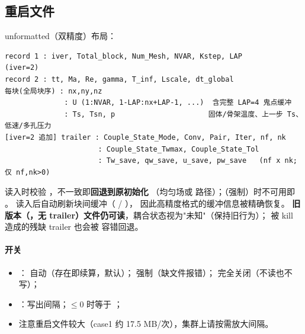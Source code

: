\subsection{重启文件 }
\label{sec:restartfile}
unformatted（双精度）布局：
\begin{lstlisting}
record 1 : iver, Total_block, Num_Mesh, NVAR, Kstep, LAP        (iver=2)
record 2 : tt, Ma, Re, gamma, T_inf, Lscale, dt_global
每块(全局块序) : nx,ny,nz
              : U (1:NVAR, 1-LAP:nx+LAP-1, ...)  含完整 LAP=4 鬼点缓冲
              : Ts, Tsn, p                      固体/骨架温度、上一步 Ts、低速/多孔压力
[iver=2 追加] trailer : Couple_State_Mode, Conv, Pair, Iter, nf, nk
                      : Couple_State_Twmax, Couple_State_Tol
                      : Tw_save, qw_save, u_save, pw_save   (nf x nk; 仅 nf,nk>0)
\end{lstlisting}
读入时校验 ，不一致即\textbf{回退到原初始化}
（均匀场或  路径）；（强制）时不可用即 。
读入后自动刷新块间缓冲（ / ），
因此高精度格式的缓冲信息被精确恢复。
\textbf{旧版本（，无 trailer）文件仍可读}，耦合状态视为"未知"（保持旧行为）；
被 kill 造成的残缺 trailer 也会被  容错回退。

\paragraph{开关}
\begin{itemize}
  \item {}： 自动（存在即续算，默认）； 强制（缺文件报错）；
         完全关闭（不读也不写）；
  \item {}：写出间隔；$\le0$ 时等于 ；
  \item 注意重启文件较大（case1 约 17.5 MB/次），集群上请按需放大间隔。
\end{itemize}

